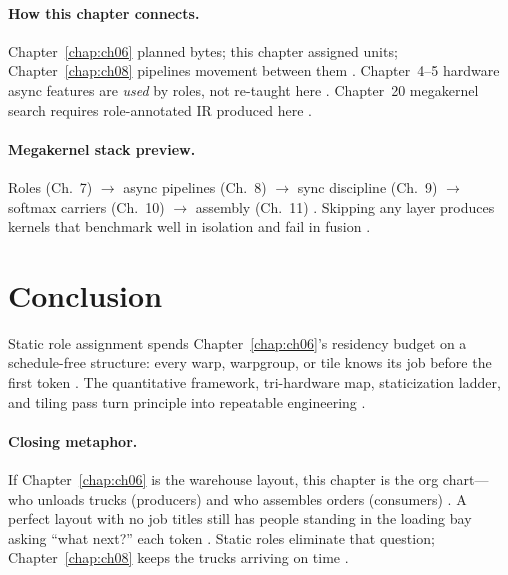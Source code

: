 \paragraph{How this chapter connects.}
Chapter~\ref{chap:ch06} planned bytes; this chapter assigned units; Chapter~\ref{chap:ch08} pipelines movement between them \citep{semianalysis2024tma,dao2022flashattention,shah2024flashattention3}.
Chapter~4--5 hardware async features are \emph{used} by roles, not re-taught here \citep{nvidia2022hopper,amd2024xdna,patel2025llminference}.
Chapter~20 megakernel search requires role-annotated IR produced here \citep{wu2024mirage,mpk2025,yirage2026,chen2020compilerbasedhardw}.

\paragraph{Megakernel stack preview.}
Roles (Ch.~7) $\rightarrow$ async pipelines (Ch.~8) $\rightarrow$ sync discipline (Ch.~9) $\rightarrow$ softmax carriers (Ch.~10) $\rightarrow$ assembly (Ch.~11) \citep{dao2022flashattention,semianalysis2024tma,shah2024flashattention3,mpk2025,patel2025llminference}.
Skipping any layer produces kernels that benchmark well in isolation and fail in fusion \citep{taxbreak2026,memoryfloor2026,yirage2026}.

\section{Conclusion}
\label{sec:ch07_conclusion}

Static role assignment spends Chapter~\ref{chap:ch06}'s residency budget on a schedule-free structure: every warp, warpgroup, or tile knows its job before the first token \citep{shah2024flashattention3,mpk2025,yirage2026}.
The quantitative framework, tri-hardware map, staticization ladder, and tiling pass turn principle into repeatable engineering \citep{patel2025llminference,chen2020compilerbasedhardw,taxbreak2026}.

\paragraph{Closing metaphor.}
If Chapter~\ref{chap:ch06} is the warehouse layout, this chapter is the org chart---who unloads trucks (producers) and who assembles orders (consumers) \citep{dao2022flashattention,yirage2026,shah2024flashattention3}.
A perfect layout with no job titles still has people standing in the loading bay asking ``what next?'' each token \citep{taxbreak2026,mpk2025}.
Static roles eliminate that question; Chapter~\ref{chap:ch08} keeps the trucks arriving on time \citep{semianalysis2024tma,dao2022flashattention}.

